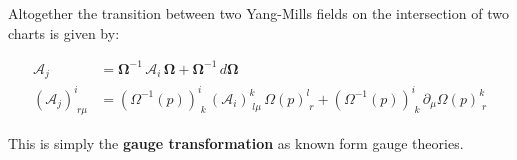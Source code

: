 Altogether the transition between two Yang-Mills fields on the intersection of two charts is given by:

\begin{align*}
\mathbf{\mathcal{A}}_j 
&= \mathbf{\Omega}^{-1} \, \mathbf{\mathcal{A}}_i \, \mathbf{\Omega} 
  + \mathbf{\Omega}^{-1} \,  d \mathbf{\Omega} \\
(\mathcal{A}_j)^i_{\; r \mu} 
&= \left( \Omega^{-1}(p) \right)^i_{\; k} \, (\mathcal{A}_i)^k_{\; l \mu} \, \Omega(p)^l_{\; r}
+ \left( \Omega^{-1}(p) \right)^i_{\; k} \, \partial_\mu \Omega(p)^k_{\; r}
\end{align*}

This is simply the \textbf{gauge transformation} as known form gauge theories.


